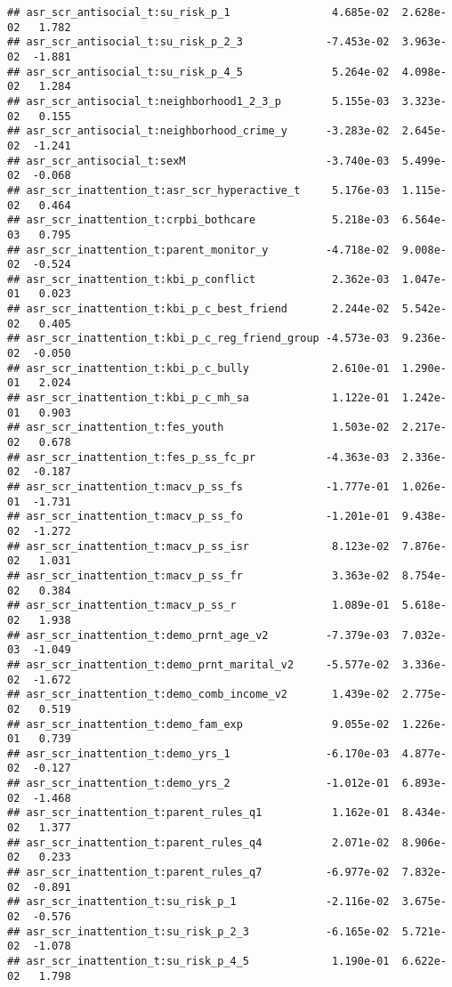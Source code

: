 \documentclass[
]{article}
\begin{document}
\begin{verbatim}
## asr_scr_antisocial_t:su_risk_p_1                4.685e-02  2.628e-02   1.782
## asr_scr_antisocial_t:su_risk_p_2_3             -7.453e-02  3.963e-02  -1.881
## asr_scr_antisocial_t:su_risk_p_4_5              5.264e-02  4.098e-02   1.284
## asr_scr_antisocial_t:neighborhood1_2_3_p        5.155e-03  3.323e-02   0.155
## asr_scr_antisocial_t:neighborhood_crime_y      -3.283e-02  2.645e-02  -1.241
## asr_scr_antisocial_t:sexM                      -3.740e-03  5.499e-02  -0.068
## asr_scr_inattention_t:asr_scr_hyperactive_t     5.176e-03  1.115e-02   0.464
## asr_scr_inattention_t:crpbi_bothcare            5.218e-03  6.564e-03   0.795
## asr_scr_inattention_t:parent_monitor_y         -4.718e-02  9.008e-02  -0.524
## asr_scr_inattention_t:kbi_p_conflict            2.362e-03  1.047e-01   0.023
## asr_scr_inattention_t:kbi_p_c_best_friend       2.244e-02  5.542e-02   0.405
## asr_scr_inattention_t:kbi_p_c_reg_friend_group -4.573e-03  9.236e-02  -0.050
## asr_scr_inattention_t:kbi_p_c_bully             2.610e-01  1.290e-01   2.024
## asr_scr_inattention_t:kbi_p_c_mh_sa             1.122e-01  1.242e-01   0.903
## asr_scr_inattention_t:fes_youth                 1.503e-02  2.217e-02   0.678
## asr_scr_inattention_t:fes_p_ss_fc_pr           -4.363e-03  2.336e-02  -0.187
## asr_scr_inattention_t:macv_p_ss_fs             -1.777e-01  1.026e-01  -1.731
## asr_scr_inattention_t:macv_p_ss_fo             -1.201e-01  9.438e-02  -1.272
## asr_scr_inattention_t:macv_p_ss_isr             8.123e-02  7.876e-02   1.031
## asr_scr_inattention_t:macv_p_ss_fr              3.363e-02  8.754e-02   0.384
## asr_scr_inattention_t:macv_p_ss_r               1.089e-01  5.618e-02   1.938
## asr_scr_inattention_t:demo_prnt_age_v2         -7.379e-03  7.032e-03  -1.049
## asr_scr_inattention_t:demo_prnt_marital_v2     -5.577e-02  3.336e-02  -1.672
## asr_scr_inattention_t:demo_comb_income_v2       1.439e-02  2.775e-02   0.519
## asr_scr_inattention_t:demo_fam_exp              9.055e-02  1.226e-01   0.739
## asr_scr_inattention_t:demo_yrs_1               -6.170e-03  4.877e-02  -0.127
## asr_scr_inattention_t:demo_yrs_2               -1.012e-01  6.893e-02  -1.468
## asr_scr_inattention_t:parent_rules_q1           1.162e-01  8.434e-02   1.377
## asr_scr_inattention_t:parent_rules_q4           2.071e-02  8.906e-02   0.233
## asr_scr_inattention_t:parent_rules_q7          -6.977e-02  7.832e-02  -0.891
## asr_scr_inattention_t:su_risk_p_1              -2.116e-02  3.675e-02  -0.576
## asr_scr_inattention_t:su_risk_p_2_3            -6.165e-02  5.721e-02  -1.078
## asr_scr_inattention_t:su_risk_p_4_5             1.190e-01  6.622e-02   1.798

\end{verbatim}
\end{document}
